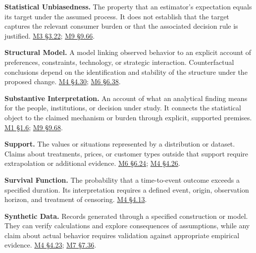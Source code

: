 \noindent\textbf{Statistical Unbiasedness.} The property that an estimator's
expectation equals its target under the assumed process. It does not
establish that the target captures the relevant consumer burden or that
the associated decision rule is justified.
\href{Marketing_Analytics_Lecture_Notes.pdf\#M03-unbiased-estimation-and-the-consequences-of-error}{M3
§3.22};
\hyperref[M09-statistical-virtues-and-ontological-laziness]{M9
§9.66}.

\noindent\textbf{Structural Model.} A model linking observed behavior to an
explicit account of preferences, constraints, technology, or strategic
interaction. Counterfactual conclusions depend on the identification and
stability of the structure under the proposed change.
\href{Marketing_Analytics_Lecture_Notes.pdf\#M04-heterogeneous-demand-market-power-and-consumer-interests}{M4
§4.30};
\href{Marketing_Analytics_Lecture_Notes.pdf\#M06-equal-historical-fit-and-different-price-effects}{M6
§6.38}.

\noindent\textbf{Substantive Interpretation.} An account of what an analytical
finding means for the people, institutions, or decision under study. It
connects the statistical object to the claimed mechanism or burden
through explicit, supported premises.
\href{Marketing_Analytics_Lecture_Notes.pdf\#M01-interpreting-and-communicating-a-result}{M1
§1.6};
\hyperref[M09-worked-assessments-of-the-missing-object]{M9
§9.68}.

\noindent\textbf{Support.} The values or situations represented by a distribution
or dataset. Claims about treatments, prices, or customer types outside
that support require extrapolation or additional evidence.
\href{Marketing_Analytics_Lecture_Notes.pdf\#M06-overlap-weight-concentration-and-missing-confounders}{M6
§6.24};
\href{Marketing_Analytics_Lecture_Notes.pdf\#M04-demand-information-pricing-and-consumer-surplus}{M4
§4.26}.

\noindent\textbf{Survival Function.} The probability that a time-to-event outcome
exceeds a specified duration. Its interpretation requires a defined
event, origin, observation horizon, and treatment of censoring.
\href{Marketing_Analytics_Lecture_Notes.pdf\#M04-mhealth-time-until-a-logging-gap}{M4
§4.13}.

\noindent\textbf{Synthetic Data.} Records generated through a specified
construction or model. They can verify calculations and explore
consequences of assumptions, while any claim about actual behavior
requires validation against appropriate empirical evidence.
\href{Marketing_Analytics_Lecture_Notes.pdf\#M04-synthetic-consumers-and-product-concept-screening}{M4
§4.23};
\href{Marketing_Analytics_Lecture_Notes.pdf\#M07-validation-of-synthetic-consumer-panels}{M7
§7.36}.

